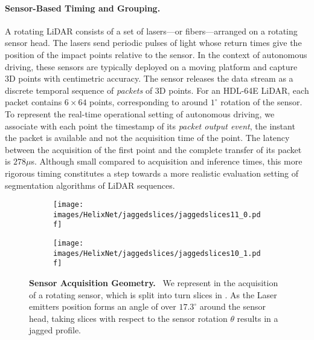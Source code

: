 \documentclass[runningheads]{tpls/llncs}
\begin{document}
\paragraph{Sensor-Based Timing and Grouping.}
A rotating LiDAR consists of a set of lasers---or fibers---arranged on a rotating sensor head. The lasers send periodic pulses of light whose return times give the position of the impact points relative to the sensor. In the context of autonomous driving, these sensors are typically deployed on a moving platform and capture 3D points with centimetric accuracy.
The sensor releases the data stream as a discrete temporal sequence of \emph{packets} of 3D points. For an HDL-64E LiDAR, each packet contains $6\times64$ points,  corresponding to around $1^\circ$ rotation of the sensor. To represent the real-time operational setting of autonomous driving, we associate with each point the timestamp of its \emph{packet output event}, \ie the instant the packet is available and not the acquisition time of the point. The latency between the acquisition of the first point and the complete transfer of its packet is $278\mu$s. Although small compared to acquisition and inference times, this more rigorous timing constitutes a step towards a more realistic evaluation setting of segmentation algorithms of LiDAR sequences. 

\begin{figure}[t]
    \centering
    \begin{subfigure}[b]{0.495\textwidth}
            \texttt{[image: images/HelixNet/jaggedslices/jaggedslices11\_0.pdf]}
        \label{fig:sub:theta}
    \end{subfigure}
    \hfill
    \begin{subfigure}[b]{0.495\textwidth}
            \texttt{[image: images/HelixNet/jaggedslices/jaggedslices10\_1.pdf]}
        \label{fig:sub:slices}
    \end{subfigure}
    \caption{\textbf{Sensor Acquisition Geometry.}~
    We represent in  the acquisition of a rotating sensor, which is split into  turn slices in . 
    As the Laser emitters position forms an angle of over $17.3^\circ$ around the sensor head, taking slices with respect to the sensor rotation $\theta$ results in a jagged profile.
    }
    \label{fig:jaggedslices}
\end{figure}
\end{document}
